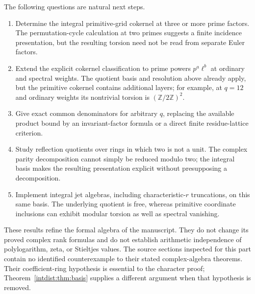 The following questions are natural next steps.
\begin{enumerate}
\item Determine the integral primitive-grid cokernel at three or more
prime factors. The permutation-cycle calculation at two primes
suggests a finite incidence presentation, but the resulting torsion
need not be read from separate Euler factors.
\item Extend the explicit cokernel classification to prime powers
$p^a\ell^b$ at ordinary and spectral weights. The quotient basis and
resolution above already apply, but the primitive cokernel contains
additional layers; for example, at $q=12$ and ordinary weights its
nontrivial torsion is $(\mathbb Z/2\mathbb Z)^2$.
\item Give exact common denominators for arbitrary $q$, replacing the
available product bound by an invariant-factor formula or a direct
finite residue-lattice criterion.
\item Study reflection quotients over rings in which two is not a
unit. The complex parity decomposition cannot simply be reduced
modulo two; the integral basis makes the resulting presentation
explicit without presupposing a decomposition.
\item Implement integral jet algebras, including characteristic-$r$
truncations, on this same basis. The underlying quotient is free,
whereas primitive coordinate inclusions can exhibit modular torsion
as well as spectral vanishing.
\end{enumerate}

These results refine the formal algebra of the manuscript. They do
not change its proved complex rank formulas and do not establish
arithmetic independence of polylogarithm, zeta, or Stieltjes values.
The source sections inspected for this part contain no identified
counterexample to their stated complex-algebra theorems. Their
coefficient-ring hypothesis is essential to the character proof;
Theorem~\ref{intdist:thm:basis} supplies a different argument when that
hypothesis is removed.

